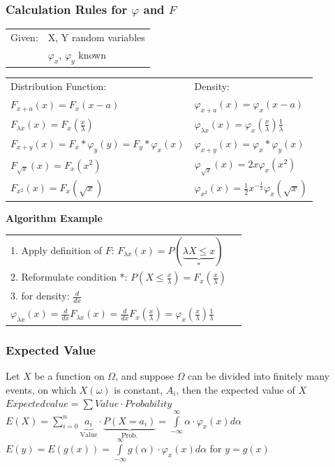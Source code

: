 	
		\subsubsection{Calculation Rules for $\varphi$ and $F$ }
			\begin{minipage}{11cm}
				\begin{tabular}{ll}
				Given: &X, Y random variables\\
				&$\varphi_x$, $\varphi_y$ known\\
				\end{tabular}
	 
				\begin{tabular}{p{6cm}p{6cm}}
				Distribution Function: &Density:\\
				$F_{x+a}(x)=F_x(x-a)$  &$\varphi_{x+a}(x)=\varphi_x(x-a)$\\
				$F_{\lambda x}(x)=F_x(\frac{x}{\lambda})$ &$\varphi_{\lambda
				x}(x)=\varphi_x(\frac{x}{\lambda})\frac{1}{\lambda}$\\
				$F_{x+y}(x)=F_x\ast\varphi_y(y)=F_y\ast\varphi_x(x)$ &
				$\varphi_{x+y}(x)=\varphi_x\ast\varphi_y(x)$\\
				$F_{\sqrt{x}}(x)=F_x(x^2)$ &
				$\varphi_{\sqrt{x}}(x)=2x\varphi_x(x^2)$\\
				$F_{x^2}(x)=F_x(\sqrt{x})$ &
				$\varphi_{x^2}(x)=\frac{1}{2}x^{-\frac{1}{2}}\varphi_x(\sqrt{x})$
				\end{tabular}
			\end{minipage}
			\begin{minipage}{7cm}
				\textbf{Algorithm Example}
				\begin{tabular}{ll}
				1. Apply definition of $F$: $F_{\lambda x}(x)=P(\underbrace
				{\lambda X\leq x}_{*})$\\ 
				2. Reformulate condition *: $P(X \leq
				\frac{x}{\lambda})=F_x(\frac{x}{\lambda})$\\ 
				3. for density: $\frac{d}{dx}$\\
				\vspace{3mm}
				$\varphi_{\lambda x}(x)=\frac{d}{dx}F_{\lambda
				x}(x)=\frac{d}{dx}F_x(\frac{x}{\lambda})=
				\varphi_x(\frac{x}{\lambda})\frac{1}{\lambda}$
				\end{tabular}
				\vspace{10mm}
			\end{minipage}


		\subsubsection{Expected Value}
			Let $X$ be a function on $\Omega$, and suppose $\Omega$ can be divided into finitely many
			events, on which $X(\omega)$ is constant, $A_i$, then the expected value of $X$\\
			$Expected value = \sum Value \cdot Probability$\\
			$E(X)=\sum\limits_{i=0}^n \underbrace{a_i}_{\text{Value}}\cdot \underbrace{P(X=a_i)}_{\text{Prob.}}=\int\limits_{-\infty}^\infty \alpha \cdot \varphi_x(x)d\alpha$\\
			$E(y)=E(g(x))=\int\limits_{-\infty}^\infty g(\alpha) \cdot \varphi_x(x)d\alpha$ \hspace{2mm} for $y=g(x)$\\
			
